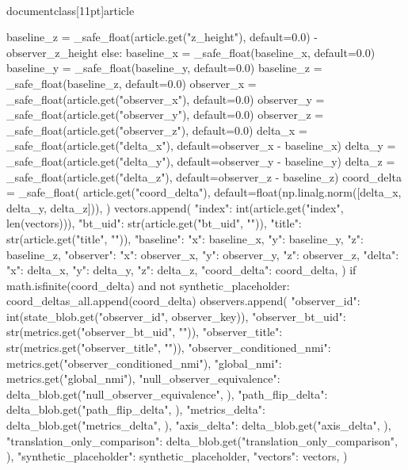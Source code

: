 \\documentclass[11pt]{article}
\begin{document}
\begin{CodeBlock}
                baseline_z = _safe_float(article.get("z_height"), default=0.0) - observer_z_height
            else:
                baseline_x = _safe_float(baseline_x, default=0.0)
                baseline_y = _safe_float(baseline_y, default=0.0)
                baseline_z = _safe_float(baseline_z, default=0.0)
            observer_x = _safe_float(article.get("observer_x"), default=0.0)
            observer_y = _safe_float(article.get("observer_y"), default=0.0)
            observer_z = _safe_float(article.get("observer_z"), default=0.0)
            delta_x = _safe_float(article.get("delta_x"), default=observer_x - baseline_x)
            delta_y = _safe_float(article.get("delta_y"), default=observer_y - baseline_y)
            delta_z = _safe_float(article.get("delta_z"), default=observer_z - baseline_z)
            coord_delta = _safe_float(
                article.get("coord_delta"),
                default=float(np.linalg.norm([delta_x, delta_y, delta_z])),
            )
            vectors.append(
                {
                    "index": int(article.get("index", len(vectors))),
                    "bt_uid": str(article.get("bt_uid", "")),
                    "title": str(article.get("title", "")),
                    "baseline": {"x": baseline_x, "y": baseline_y, "z": baseline_z},
                    "observer": {"x": observer_x, "y": observer_y, "z": observer_z},
                    "delta": {"x": delta_x, "y": delta_y, "z": delta_z},
                    "coord_delta": coord_delta,
                }
            )
            if math.isfinite(coord_delta) and not synthetic_placeholder:
                coord_deltas_all.append(coord_delta)
        observers.append(
            {
                "observer_id": int(state_blob.get("observer_id", observer_key)),
                "observer_bt_uid": str(metrics.get("observer_bt_uid", "")),
                "observer_title": str(metrics.get("observer_title", "")),
                "observer_conditioned_nmi": metrics.get("observer_conditioned_nmi"),
                "global_nmi": metrics.get("global_nmi"),
                "null_observer_equivalence": delta_blob.get("null_observer_equivalence", {}),
                "path_flip_delta": delta_blob.get("path_flip_delta", {}),
                "metrics_delta": delta_blob.get("metrics_delta", {}),
                "axis_delta": delta_blob.get("axis_delta", {}),
                "translation_only_comparison": delta_blob.get("translation_only_comparison", {}),
                "synthetic_placeholder": synthetic_placeholder,
                "vectors": vectors,
            }
        )


\end{CodeBlock}
\end{document}
